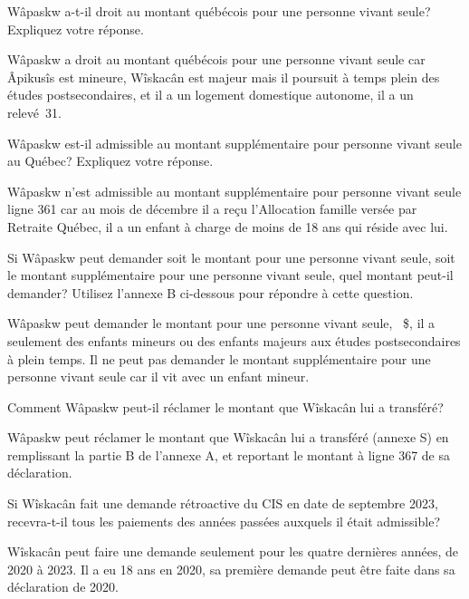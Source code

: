 \begin{question}
	Wâpaskw a-t-il droit au montant québécois pour une personne vivant seule? Expliquez votre réponse.
\end{question}
Wâpaskw a droit au montant québécois pour une personne vivant seule car Âpikusîs est mineure, Wîskacân est majeur mais il poursuit à temps plein des études postsecondaires, et il a un logement domestique autonome, il a un relevé~31.

\begin{question}
	Wâpaskw est-il admissible au montant supplémentaire pour personne vivant seule au Québec? Expliquez votre réponse.
\end{question}
Wâpaskw n'est admissible au montant supplémentaire pour personne vivant seule ligne 361 car au mois de décembre il a reçu l'Allocation famille versée par Retraite Québec, il a un enfant à charge de moins de 18 ans qui réside avec lui.

\begin{question}
	Si Wâpaskw peut demander soit le montant pour une personne vivant seule, soit le montant supplémentaire pour une personne vivant seule, quel montant peut-il demander? Utilisez l'annexe B ci-dessous pour répondre à cette question.
\end{question}
Wâpaskw peut demander le montant pour une personne vivant seule, ~\$, il a seulement des enfants mineurs ou des enfants majeurs aux études postsecondaires à plein temps. Il ne peut pas demander le montant supplémentaire pour une personne vivant seule car il vit avec un enfant mineur.

\begin{question}
	Comment Wâpaskw peut-il réclamer le montant que Wîskacân lui a transféré?
\end{question}
Wâpaskw peut réclamer le montant que Wîskacân lui a transféré (annexe S) en remplissant la partie B de l'annexe A, et reportant le montant à ligne 367 de sa déclaration. 

\begin{question}
	Si Wîskacân fait une demande rétroactive du CIS en date de septembre 2023, recevra-t-il tous les paiements des années passées auxquels il était admissible?
\end{question}
Wîskacân peut faire une demande seulement pour les quatre dernières années, de 2020 à 2023. Il a eu 18 ans en 2020, sa première demande peut être faite dans sa déclaration de 2020.
